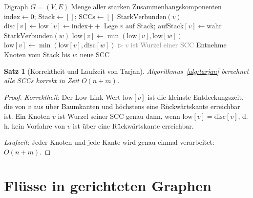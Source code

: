 ﻿\documentclass[a4paper,12pt,openany,oneside]{book}
\renewcommand{\algorithmiccomment}[1]{\hfill\textcolor{gray}{$\triangleright$ #1}}
\theoremstyle{definition}
\theoremstyle{plain}
\newtheorem{satz}{Satz}[chapter]
\theoremstyle{remark}
\begin{document}
\begin{algorithm}[H]
  \caption{Tarjans SCC-Algorithmus}
  \label{alg:tarjan}
  \begin{algorithmic}[1]
    \Require Digraph $G = (V, E)$
    \Ensure Menge aller starken Zusammenhangskomponenten
    \State $\mathrm{index} \gets 0$;
           $\mathrm{Stack} \gets []$; $\mathrm{SCCs} \gets []$
        \State $\mathrm{StarkVerbunden}(v)$
      \EndIf
    \EndFor
      \State $\mathrm{disc}[v] \gets \mathrm{low}[v] \gets
             \mathrm{index}\mathtt{++}$
      \State Lege $v$ auf $\mathrm{Stack}$;
             $\mathrm{aufStack}[v] \gets \mathrm{wahr}$
          \State $\mathrm{StarkVerbunden}(w)$
          \State $\mathrm{low}[v] \gets
                 \min(\mathrm{low}[v], \mathrm{low}[w])$
          \State $\mathrm{low}[v] \gets
                 \min(\mathrm{low}[v], \mathrm{disc}[w])$
        \EndIf
      \EndFor
             \algorithmiccomment{$v$ ist Wurzel einer SCC}
        \State Entnehme Knoten vom Stack bis $v$: neue SCC
      \EndIf
    \EndProcedure
  \end{algorithmic}
\end{algorithm}

\begin{satz}[Korrektheit und Laufzeit von Tarjan]
  Algorithmus~\ref{alg:tarjan} berechnet alle SCCs korrekt in Zeit
  $O(n+m)$.
\end{satz}

\begin{proof}
  \emph{Korrektheit}: Der Low-Link-Wert $\mathrm{low}[v]$ ist die kleinste
  Entdeckungszeit, die von $v$ aus \"uber Baumkanten und h\"ochstens eine
  R\"uckw\"artskante erreichbar ist. Ein Knoten $v$ ist Wurzel seiner SCC
  genau dann, wenn $\mathrm{low}[v] = \mathrm{disc}[v]$, d.\,h. kein
  Vorfahre von $v$ ist \"uber eine R\"uckw\"artskante erreichbar.

  \emph{Laufzeit}: Jeder Knoten und jede Kante wird genau einmal
  verarbeitet: $O(n+m)$.
\end{proof}

\section{Fl\"usse in gerichteten Graphen}
\end{document}
